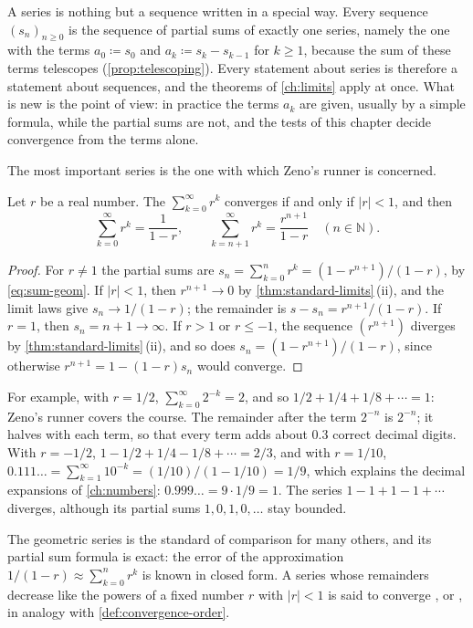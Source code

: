 A series is nothing but a sequence written in a special way. Every sequence $(s_n)_{n\ge0}$ is the sequence of partial sums of exactly one series, namely the one with the terms $a_0\coloneqq s_0$ and $a_k\coloneqq s_k-s_{k-1}$ for $k\ge1$, because the sum of these terms telescopes (\cref{prop:telescoping}). Every statement about series is therefore a statement about sequences, and the theorems of \cref{ch:limits} apply at once. What is new is the point of view: in practice the terms $a_k$ are given, usually by a simple formula, while the partial sums are not, and the tests of this chapter decide convergence from the terms alone.

The most important series is the one with which Zeno's runner is concerned.

\begin{proposition}
\label{prop:geometric-series}
Let $r$ be a real number. The  $\sum_{k=0}^\infty r^k$ converges if and only if $|r|<1$, and then
\[
\sum_{k=0}^\infty r^k=\frac1{1-r},\qquad\sum_{k=n+1}^\infty r^k=\frac{r^{n+1}}{1-r}\quad(n\in\mathbb N).
\]
\end{proposition}

\begin{proof}
For $r\ne1$ the partial sums are $s_n=\sum_{k=0}^nr^k=(1-r^{n+1})/(1-r)$, by \eqref{eq:sum-geom}. If $|r|<1$, then $r^{n+1}\to0$ by \cref{thm:standard-limits}\,(ii), and the limit laws give $s_n\to1/(1-r)$; the remainder is $s-s_n=r^{n+1}/(1-r)$. If $r=1$, then $s_n=n+1\to\infty$. If $r>1$ or $r\le-1$, the sequence $(r^{n+1})$ diverges by \cref{thm:standard-limits}\,(ii), and so does $s_n=(1-r^{n+1})/(1-r)$, since otherwise $r^{n+1}=1-(1-r)s_n$ would converge.
\end{proof}

For example, with $r=1/2$, $\sum_{k=0}^\infty2^{-k}=2$, and so $1/2+1/4+1/8+\cdots=1$: Zeno's runner covers the course. The remainder after the term $2^{-n}$ is $2^{-n}$; it halves with each term, so that every term adds about $0.3$ correct decimal digits. With $r=-1/2$, $1-1/2+1/4-1/8+\cdots=2/3$, and with $r=1/10$, $0.111\ldots=\sum_{k=1}^\infty10^{-k}=(1/10)/(1-1/10)=1/9$, which explains the decimal expansions of \cref{ch:numbers}: $0.999\ldots=9\cdot1/9=1$. The series $1-1+1-1+\cdots$ diverges, although its partial sums $1,0,1,0,\ldots$ stay bounded.

The geometric series is the standard of comparison for many others, and its partial sum formula is exact: the error of the approximation $1/(1-r)\approx\sum_{k=0}^nr^k$ is known in closed form. A series whose remainders decrease like the powers of a fixed number $r$ with $|r|<1$ is said to converge , or , in analogy with \cref{def:convergence-order}.

